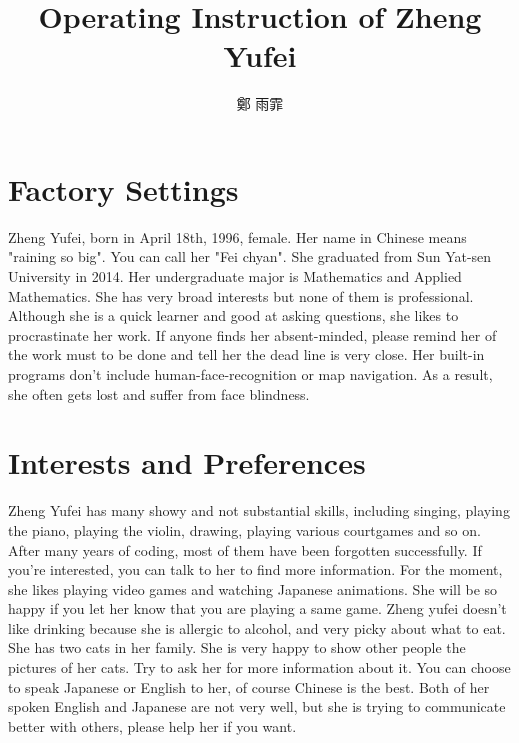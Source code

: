 \documentclass[a4]{jarticle}
\title{Operating Instruction of Zheng Yufei}
\author{鄭 雨霏} %
\begin{document}
    \twocolumn{
    \maketitle
    }

    \section{Factory Settings}


    Zheng Yufei, born in April 18th, 1996, female. Her name in Chinese means "raining so big".
    You can call her "Fei chyan". She graduated from
    Sun Yat-sen University in 2014. Her undergraduate major is Mathematics
    and Applied Mathematics. She has very broad interests but none of
    them is professional. Although she is a quick learner and good at
    asking questions, she likes to procrastinate her work. If anyone
    finds her absent-minded, please remind her of the work must to be
    done and tell her the dead line is very close. Her built-in programs
    don't include human-face-recognition or map navigation. As a result,
    she often gets lost and suffer from face blindness.

    \section{Interests and Preferences}

    Zheng Yufei has many showy and not substantial skills, including singing,
    playing the piano, playing the violin, drawing, playing various courtgames
    and so on. After many years of coding, most of them have been forgotten
    successfully. If you're interested, you can talk to her to find more
    information. For the moment, she likes playing video games and watching
    Japanese animations. She will be so happy if you let her know that you
    are playing a same game. Zheng yufei doesn't like drinking because she
    is allergic to alcohol, and very picky about what to eat. She has two cats in
    her family. She is very happy to show other people the pictures of her cats.
    Try to ask her for more information about it. You can choose to speak
    Japanese or English to her, of course Chinese is the best. Both of her spoken
    English and Japanese are not very well, but she is trying to communicate
    better with others, please help her if you want.
\end{document}
